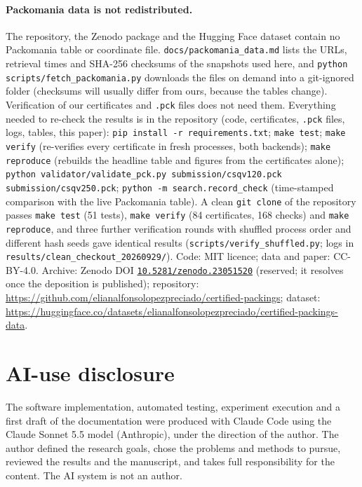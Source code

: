 \documentclass[10pt]{article}
\newcommand{\zenododoi}{10.5281/zenodo.23051520}%
\begin{document}
\paragraph{Packomania data is not redistributed.} The repository, the Zenodo package and the Hugging Face dataset contain no Packomania table or coordinate file. \texttt{docs/packomania\_data.md} lists the URLs, retrieval times and SHA-256 checksums of the snapshots used here, and \texttt{python scripts/fetch\_packomania.py} downloads the files on demand into a git-ignored folder (checksums will usually differ from ours, because the tables change). Verification of our certificates and \texttt{.pck} files does not need them.
Everything needed to re-check the results is in the repository (code, certificates, \texttt{.pck} files, logs, tables, this paper): \texttt{pip install -r requirements.txt}; \texttt{make test}; \texttt{make verify} (re-verifies every certificate in fresh processes, both backends); \texttt{make reproduce} (rebuilds the headline table and figures from the certificates alone);
\texttt{python validator/validate\_pck.py submission/csqv120.pck submission/csqv250.pck}; \texttt{python -m search.record\_check} (time-stamped comparison with the live Packomania table). A clean \texttt{git clone} of the repository passes \texttt{make test} (51 tests), \texttt{make verify} (84 certificates, 168 checks) and \texttt{make reproduce}, and three further verification rounds with shuffled process order and different hash seeds gave identical results (\texttt{scripts/verify\_shuffled.py}; logs in \texttt{results/clean\_checkout\_20260929/}). Code: MIT licence; data and paper: CC-BY-4.0.
Archive: Zenodo DOI \href{https://doi.org/\zenododoi}{\texttt{\zenododoi}} (reserved; it resolves once the deposition is published); repository: \url{https://github.com/elianalfonsolopezpreciado/certified-packings}; dataset: \url{https://huggingface.co/datasets/elianalfonsolopezpreciado/certified-packings-data}.

\section*{AI-use disclosure}
The software implementation, automated testing, experiment execution and a first draft of the documentation were produced with Claude Code using the Claude Sonnet 5.5 model (Anthropic), under the direction of the author.
The author defined the research goals, chose the problems and methods to pursue, reviewed the results and the manuscript, and takes full responsibility for the content. The AI system is not an author.
\end{document}
